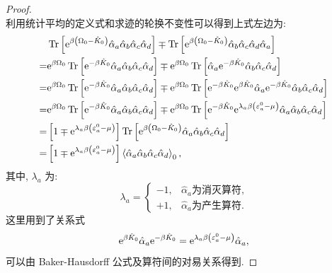 \begin{proof}
\begin{equation}
\end{equation}
利用统计平均的定义式和求迹的轮换不变性可以得到上式左边为:
\begin{align}
& \operatorname{Tr}\left[\mathrm{e}^{\beta\left(\Omega_0-\hat{K}_0\right)} \hat{\alpha}_a \hat{\alpha}_b \hat{\alpha}_c \hat{\alpha}_d\right] \mp \operatorname{Tr}\left[\mathrm{e}^{\beta\left(\Omega_0-\hat{K}_0\right)} \hat{\alpha}_b \hat{\alpha}_c \hat{\alpha}_d \hat{\alpha}_a\right] \nonumber\\
= & \mathrm{e}^{\beta \Omega_0} \operatorname{Tr}\left[\mathrm{e}^{-\beta \hat{K}_0} \hat{\alpha}_a \hat{\alpha}_b \hat{\alpha}_c \hat{\alpha}_d\right] \mp \mathrm{e}^{\beta \Omega_0} \operatorname{Tr}\left[\hat{\alpha}_a \mathrm{e}^{-\beta \hat{K}_0} \hat{\alpha}_b \hat{\alpha}_c \hat{\alpha}_d\right] \nonumber\\
= & \mathrm{e}^{\beta \Omega_0} \operatorname{Tr}\left[\mathrm{e}^{-\beta \hat{K}_0} \hat{\alpha}_a \hat{\alpha}_b \hat{\alpha}_c \hat{\alpha}_d\right] \mp \mathrm{e}^{\beta \Omega_0} \operatorname{Tr}\left[\mathrm{e}^{-\beta \hat{K}_0} \mathrm{e}^{\beta \hat{K}_0} \hat{\alpha}_a \mathrm{e}^{-\beta \hat{K}_0} \hat{\alpha}_b \hat{\alpha}_c \hat{\alpha}_d\right]\nonumber \\
= & \mathrm{e}^{\beta \Omega_0} \operatorname{Tr}\left[\mathrm{e}^{-\beta \hat{K}_0} \hat{\alpha}_a \hat{\alpha}_b \hat{\alpha}_c \hat{\alpha}_d\right] \mp \mathrm{e}^{\beta \Omega_0} \operatorname{Tr}\left[\mathrm{e}^{-\beta \hat{K}_0} \mathrm{e}^{\lambda_a \beta\left(\varepsilon_a^0-\mu\right)} \hat{\alpha}_a \hat{\alpha}_b \hat{\alpha}_c \hat{\alpha}_d\right] \nonumber\\
= & \left[1 \mp \mathrm{e}^{\lambda_a \beta\left(\varepsilon_a^0-\mu\right)}\right] \operatorname{Tr}\left[\mathrm{e}^{\beta\left(\Omega_0-\hat{K}_0\right)} \hat{\alpha}_a \hat{\alpha}_b \hat{\alpha}_c \hat{\alpha}_d\right]\nonumber \\
= & \left[1 \mp \mathrm{e}^{\lambda_a \beta\left(\varepsilon_a^0-\mu\right)}\right]\left\langle\hat{\alpha}_a \hat{\alpha}_b \hat{\alpha}_c \hat{\alpha}_d\right\rangle_0,
\end{align}
其中, $\lambda_a$ 为:
\begin{equation}
\lambda_a= \begin{cases}-1, & \hat{\alpha}_a \text {为消灭算符,} \\ +1, & \hat{\alpha}_a \text {为产生算符.}\end{cases}
\end{equation}
这里用到了关系式
\begin{equation}
\mathrm{e}^{\beta \hat{K}_0} \hat{\alpha}_a \mathrm{e}^{-\beta \hat{K}_0}=\mathrm{e}^{\lambda_a \beta\left(\varepsilon_a^0-\mu\right)}\hat{\alpha}_a,
\end{equation}
可以由 Baker-Hausdorff 公式及算符间的对易关系得到. 


\end{proof}
